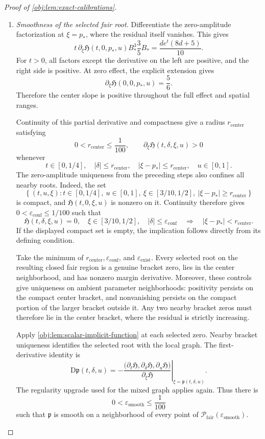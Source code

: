 \documentclass[11pt]{article}
\begin{document}
\begin{proof}[Proof of \cref{obj:lem:exact-calibrations}]
\begin{enumerate}
\item \emph{Smoothness of the selected fair root.}
Differentiate the zero-amplitude factorization at \(\xi=p_*\), where the residual itself vanishes. This gives
\[
t\,\partial_\xi\mathfrak H(t,0,p_*,u)
B_*^3\frac35B_*
=
\frac{de^t(8d+5)}{10}.
\]
For \(t>0\), all factors except the derivative on the left are positive, and the right side is positive. At zero effect, the explicit extension gives
\[
\partial_\xi\mathfrak H(0,0,p_*,u)=\frac56.
\]
Therefore the center slope is positive throughout the full effect and spatial ranges.

Continuity of this partial derivative and compactness give a radius
\(r_{\mathrm{center}}\) satisfying
\[
0<r_{\mathrm{center}}\le\frac1{100},
\qquad
\partial_\xi\mathfrak H(t,\delta,\xi,u)>0
\]
whenever
\[
t\in[0,1/4],\quad
|\delta|\le r_{\mathrm{center}},\quad
|\xi-p_*|\le r_{\mathrm{center}},\quad
u\in[0,1].
\]
The zero-amplitude uniqueness from the preceding steps also confines all nearby roots. Indeed, the set
\[
\left\{
(t,u,\xi):
t\in[0,1/4],\ u\in[0,1],\
\xi\in[3/10,1/2],\
|\xi-p_*|\ge r_{\mathrm{center}}
\right\}
\]
is compact, and \(\mathfrak H(t,0,\xi,u)\) is nonzero on it. Continuity therefore gives
\(0<\varepsilon_{\mathrm{conf}}\le1/100\) such that
\[
\mathfrak H(t,\delta,\xi,u)=0,\quad
\xi\in[3/10,1/2],\quad
|\delta|\le\varepsilon_{\mathrm{conf}}
\quad\Longrightarrow\quad
|\xi-p_*|<r_{\mathrm{center}}.
\]
If the displayed compact set is empty, the implication follows directly from its defining condition.

Take the minimum of
\(r_{\mathrm{center}},\varepsilon_{\mathrm{conf}}\), and
\(\varepsilon_{\mathrm{exist}}\). Every selected root on the resulting closed fair region is a genuine bracket zero, lies in the center neighborhood, and has nonzero margin derivative. Moreover, these controls give uniqueness on ambient parameter neighborhoods: positivity persists on the compact center bracket, and nonvanishing persists on the compact portion of the larger bracket outside it. Any two nearby bracket zeros must therefore lie in the center bracket, where the residual is strictly increasing.

Apply \cref{obj:lem:scalar-implicit-function} at each selected zero. Nearby bracket uniqueness identifies the selected root with the local graph. The first-derivative identity is
\[
\mathrm D\mathfrak p(t,\delta,u)
=
-\left.
\frac{
\bigl(\partial_t\mathfrak H,
      \partial_\delta\mathfrak H,
      \partial_u\mathfrak H\bigr)}
{\partial_\xi\mathfrak H}
\right|_{\xi=\mathfrak p(t,\delta,u)} .
\]
The regularity upgrade used for the mixed graph applies again. Thus there is
\[
0<\varepsilon_{\mathrm{smooth}}\le\frac1{100}
\]
such that \(\mathfrak p\) is smooth on a neighborhood of every point of
\(\mathcal P_{\mathrm{fair}}(\varepsilon_{\mathrm{smooth}})\).


\end{enumerate}
\end{proof}
\end{document}
